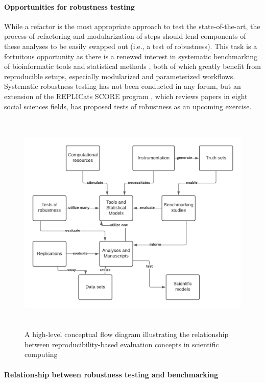\documentclass{drexelthesis}
\begin{document}
\paragraph{Opportunities for robustness testing}

While a refactor is the most appropriate approach to test the state-of-the-art, the process of refactoring and modularization of steps should lend components of these analyses to be easily swapped out (i.e., a test of robustness). This task is a fortuitous opportunity as there is a renewed interest in systematic benchmarking of bioinformatic tools \cite{Mangul2019-cy} and statistical methods \cite{McIntyre2017-wr}, both of which greatly benefit from reproducible setups, especially modularized and parameterized workflows. Systematic robustness testing has not been conducted in any forum, but an extension of the REPLICats SCORE program \cite{Fraser2021-xc}, which reviews papers in eight social sciences fields, has proposed tests of robustness as an upcoming exercise. 


\begin{figure}[h!]
	\centering
	\includegraphics[width=13.76cm,height=10.81cm]{./images/concept.png}
	\caption{A high-level conceptual flow diagram illustrating the relationship between reproducibility-based evaluation concepts in scientific computing}
	\label{concept}
\end{figure}

\paragraph{Relationship between robustness testing and benchmarking}
\end{document}
